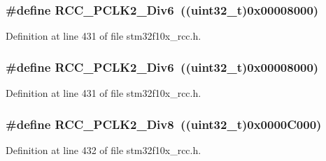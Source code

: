 \subsubsection[{\texorpdfstring{R\+C\+C\+\_\+\+P\+C\+L\+K2\+\_\+\+Div6}{RCC_PCLK2_Div6}}]{\setlength{\rightskip}{0pt plus 5cm}\#define R\+C\+C\+\_\+\+P\+C\+L\+K2\+\_\+\+Div6~(({\bf uint32\+\_\+t})0x00008000)}\hypertarget{group___a_d_c__clock__source_gaffb34a845f94f4ea741a45998d28deb3}{}\label{group___a_d_c__clock__source_gaffb34a845f94f4ea741a45998d28deb3}


Definition at line 431 of file stm32f10x\+\_\+rcc.\+h.

\subsubsection[{\texorpdfstring{R\+C\+C\+\_\+\+P\+C\+L\+K2\+\_\+\+Div6}{RCC_PCLK2_Div6}}]{\setlength{\rightskip}{0pt plus 5cm}\#define R\+C\+C\+\_\+\+P\+C\+L\+K2\+\_\+\+Div6~(({\bf uint32\+\_\+t})0x00008000)}\hypertarget{group___a_d_c__clock__source_gaffb34a845f94f4ea741a45998d28deb3}{}\label{group___a_d_c__clock__source_gaffb34a845f94f4ea741a45998d28deb3}


Definition at line 431 of file stm32f10x\+\_\+rcc.\+h.

\subsubsection[{\texorpdfstring{R\+C\+C\+\_\+\+P\+C\+L\+K2\+\_\+\+Div8}{RCC_PCLK2_Div8}}]{\setlength{\rightskip}{0pt plus 5cm}\#define R\+C\+C\+\_\+\+P\+C\+L\+K2\+\_\+\+Div8~(({\bf uint32\+\_\+t})0x0000\+C000)}\hypertarget{group___a_d_c__clock__source_ga77d5c803e2d31a806467bb7db9d24cd0}{}\label{group___a_d_c__clock__source_ga77d5c803e2d31a806467bb7db9d24cd0}


Definition at line 432 of file stm32f10x\+\_\+rcc.\+h.

